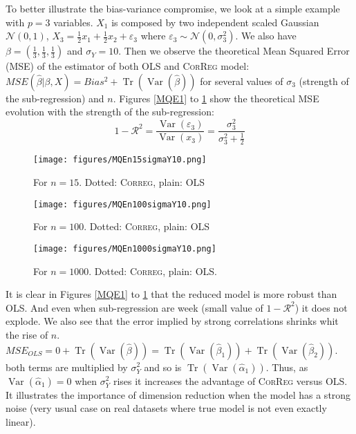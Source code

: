 \documentclass[11pt,a4paper]{article}
\begin{document}
	To better illustrate the bias-variance compromise, we look at a simple example with $p=3$ variables. $X_1$ is composed by two independent scaled Gaussian $\mathcal{N}(0,1)$, $X_3=\frac{1}{2}x_1+\frac{1}{2}x_2+\varepsilon_3$ where $\varepsilon_3\sim{\mathcal{N}(0,\sigma_3^2)}$. We also have $\beta=(\frac{1}{3},\frac{1}{3},\frac{1}{3})$ and $\sigma_Y=10$. Then we observe the theoretical Mean Squared Error (MSE) of the estimator of both OLS and \textsc{CorReg} model: $MSE(\hat{\beta}|\beta,X)=Bias^2+\operatorname{Tr}(\operatorname{Var}(\hat{\beta}))$ for several values of $\sigma_3$ (strength of the sub-regression) and $n$. Figures \ref{MQE1} to \ref{MQE3} show the theoretical MSE evolution with the strength of the sub-regression:
	\begin{equation}
		1-\mathcal{R}^2=\frac{\operatorname{Var}(\varepsilon_3)}{\operatorname{Var}(x_3)}=\frac{\sigma_3^2}{\sigma_3^2+\frac{1}{2}}
	\end{equation}
	
\begin{figure}[h!]
	\begin{minipage}[l]{.32\linewidth}
			\texttt{[image: figures/MQEn15sigmaY10.png]} 
			\caption{For $n=15$. Dotted: \textsc{Correg}, plain: OLS}\label{MQE1}
	\end{minipage} \hfill
	\begin{minipage}[c]{.32\linewidth}
			\texttt{[image: figures/MQEn100sigmaY10.png]} 
			\caption{For $n=100$. Dotted: \textsc{Correg}, plain: OLS}
	\end{minipage} \hfill
   \begin{minipage}[r]{.32\linewidth}
			\texttt{[image: figures/MQEn1000sigmaY10.png]} 
			\caption{For $n=1000$. Dotted: \textsc{Correg}, plain: OLS.} \label{MQE3}
   \end{minipage} 
\end{figure} 
It is clear in Figures \ref{MQE1} to \ref{MQE3} that the reduced model is more robust than OLS. And even when sub-regression are week (small value of $1-\mathcal{R}^2$) it does not explode. We also see that the error implied by strong correlations shrinks whit the rise of $n$.  $MSE_{OLS}=0+\operatorname{Tr}(\operatorname{Var}(\hat{\beta}))=\operatorname{Tr}(\operatorname{Var}(\hat{\beta}_{1}))+\operatorname{Tr}(\operatorname{Var}(\hat{\beta}_{2}))$. both terms are multiplied by $\sigma_Y^2$ and so is $\operatorname{Tr}(\operatorname{Var}(\hat{\alpha}_{1}))$. Thus, as $\operatorname{Var}(\hat{\alpha}_{1})=0$ when $\sigma_Y^2$ rises it increases the advantage of \textsc{CorReg} versus OLS. It illustrates the importance of dimension reduction when the model has a strong noise (very usual case on real datasets where true model is not even exactly linear).
\end{document}
